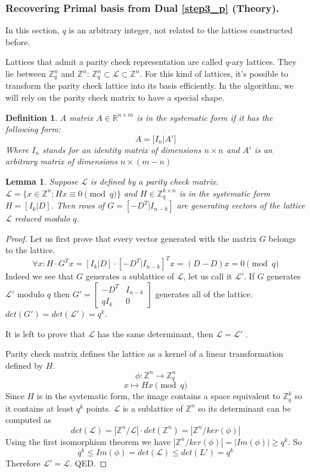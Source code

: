 \documentclass[12pt]{article}
\newcommand{\ZZ}{\mathbb{Z}}
\newcommand{\LL}{\mathcal{L}}
\newtheorem{lemma}{Lemma}
\newtheorem{definition}{Definition}
\begin{document}
\subsubsection{Recovering Primal basis from Dual \ref{step3_p} (Theory).}
\label{subsubsec:primal_from_dual_t_polynomials}

In this section, $q$ is an arbitrary integer, not related to the lattices constructed before.

Lattices that admit a parity check representation are called $q$-ary lattices. They lie between $\ZZ^{n}_{q}$ and $\ZZ^{n}$: $\ZZ^{n}_{q}  \subset \LL \subset \ZZ^{n}$. For this kind of lattices, it's possible to transform the parity check lattice into its basis efficiently. In the algorithm, we will rely on the parity check matrix to have a special shape.
\begin{definition}
A matrix $A \in \mathbb{R}^{n \times m}$ is in the systematic form if it has the following form:
\[
A = \big[ I_{n} | A' \big]
\]
Where $I_{n}$ stands for an identity matrix of dimensions $n \times n$ and $A'$ is an arbitrary matrix of dimensions $n \times (m-n)$
\end{definition}

\begin{lemma}\label{coolfact}
    Suppose $\LL$ is defined by a parity check matrix. $\LL = \{x \in \ZZ^{n}: Hx \equiv 0 \pmod{q}\}$ and $H \in \ZZ_{q}^{k \times n}$ is in the systematic form $H = [I_{k}| D]$. Then rows of $G = [-D^{T}| I_{n-k}]$ are generating vectors of the lattice $\LL$ reduced modulo $q$.
\end{lemma}
\begin{proof}
Let us first prove that every vector generated with the matrix $G$ belongs to the lattice.
\[
\forall x: H \cdot G^{T}x = [I_{k}|D] \cdot [-D^{T}| I_{n-k}]^{T}x = (D - D)x = 0 \pmod{q}
\]
Indeed we see that $G$ generates a sublattice of $\LL$, let us call it $\LL'$. If $G$ generates $\LL'$ modulo $q$ then
$
G' = \left[ \begin{array}{c|c} -D^{T} & I_{n-k} \\ \hline qI_k & 0 \end{array}\right]
$
generates all of the lattice. $det(G') = det(\LL') = q^{k}$.

It is left to prove that $\LL$ has the same determinant, then $\LL= \LL'$ .

Parity check matrix defines the lattice as a kernel of a linear transformation defined by $H$.
\[
    \phi: \ZZ^{n} \rightarrow \ZZ_q^{n}
\]
\[
    x \mapsto Hx \pmod{q}
\]
Since $H$ is in the systematic form, the image contains a space equivalent to $\ZZ_{q}^{k}$ so it contains at least $q^{k}$ points. $\LL$ is a sublattice of $\ZZ^{n}$ so its determinant can be computed as
\[
    det(\LL) = |\ZZ^{n}/\LL| \cdot det(\ZZ^{n}) = |\ZZ^{n}/ker(\phi)|
\]
Using the first isomorphism theorem we have $|\ZZ^{n}/ker(\phi)| = |Im(\phi)| \geq q^{k}$. So
\[
    q^{k} \leq Im(\phi) = det(\LL) \leq det(L') = q^{k}
\]
Therefore $\LL' = \LL$. QED.
\end{proof}
\end{document}
